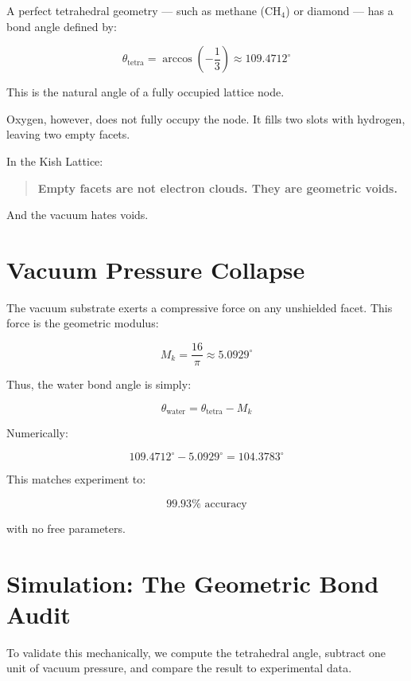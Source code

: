 \documentclass[11pt, letterpaper, openany]{book}
\begin{document}
A perfect tetrahedral geometry — such as methane (CH$_4$) or diamond — has a bond angle defined by:



\[
\theta_{\text{tetra}} = \arccos\left(-\frac{1}{3}\right) \approx 109.4712^\circ
\]



This is the natural angle of a fully occupied lattice node.

Oxygen, however, does not fully occupy the node.  
It fills two slots with hydrogen, leaving two empty facets.

In the Kish Lattice:

\begin{quote}
\textbf{Empty facets are not electron clouds.  
They are geometric voids.}
\end{quote}

And the vacuum hates voids.

\section{Vacuum Pressure Collapse}

The vacuum substrate exerts a compressive force on any unshielded facet.  
This force is the geometric modulus:



\[
M_k = \frac{16}{\pi} \approx 5.0929^\circ
\]



Thus, the water bond angle is simply:



\[
\theta_{\text{water}} = \theta_{\text{tetra}} - M_k
\]



Numerically:



\[
109.4712^\circ - 5.0929^\circ = 104.3783^\circ
\]



This matches experiment to:



\[
99.93\% \text{ accuracy}
\]



with no free parameters.

\section{Simulation: The Geometric Bond Audit}

To validate this mechanically, we compute the tetrahedral angle, subtract one unit of vacuum pressure, and compare the result to experimental data.
\end{document}
